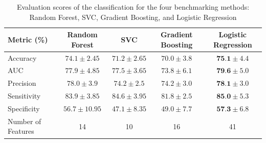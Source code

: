 



  

\begin{table}[htb]
\centering
\captionsetup{justification=centering}  %
\caption{Evaluation scores of the classification for the four benchmarking methods: Random Forest, SVC, Gradient Boosting, and Logistic Regression}
\label{table:1}
\small
\begin{tabular}{@{}lcccc@{}}  %
\toprule
\textsf{Metric (\%)} & \textsf{Random Forest} & \textsf{SVC} & \textsf{Gradient Boosting} & \textsf{Logistic Regression} \\
\midrule
Accuracy           & $74.1 \pm 2.45$ & $71.2 \pm 2.65$ & $70.0 \pm 3.8$ & $\textbf{75.1} \pm 4.4$ \\
AUC                & $77.9 \pm 4.85$ & $77.5 \pm 3.65$ & $73.8 \pm 6.1$ & $\textbf{79.6} \pm 5.0$ \\
Precision          & $78.0 \pm 3.9$ & $74.2 \pm 2.5$ & $74.2 \pm 3.0$ & $\textbf{78.1} \pm 3.0$ \\
Sensitivity        & $83.9 \pm 3.85$ & $84.6 \pm 3.95$ & $81.8 \pm 2.5$ & $\textbf{85.0} \pm 5.3$ \\
Specificity        & $56.7 \pm 10.95$ & $47.1 \pm 8.35$ & $49.0 \pm 7.7$ & $\textbf{57.3} \pm 6.8$ \\
\midrule
Number of Features & 14   & 10   & 16   & 41 \\
\bottomrule
\end{tabular}
\end{table}

